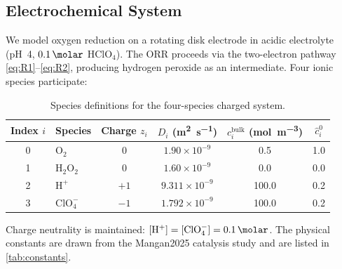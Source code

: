 \documentclass[11pt,a4paper]{article}
\begin{document}
\subsection{Electrochemical System}\label{sec:system}

We model oxygen reduction on a rotating disk electrode in acidic
electrolyte (pH~4, $\SI{0.1}{\molar}$ $\mathrm{HClO_4}$). The ORR
proceeds via the two-electron pathway \eqref{eq:R1}--\eqref{eq:R2},
producing hydrogen peroxide as an intermediate. Four ionic species
participate:

\begin{table}[H]
\centering
\caption{Species definitions for the four-species charged system.}
\label{tab:species}
\begin{tabular}{clcccc}
\toprule
Index $i$ & Species & Charge $z_i$ & $D_i$ (\si{\metre\squared\per\second})
  & $c_i^{\mathrm{bulk}}$ (\si{\mol\per\metre\cubed})
  & $\hat{c}_i^0$ \\
\midrule
0 & $\mathrm{O_2}$      &  0  & $1.90 \times 10^{-9}$ & 0.5   & 1.0 \\
1 & $\mathrm{H_2O_2}$   &  0  & $1.60 \times 10^{-9}$ & 0.0   & 0.0 \\
2 & $\mathrm{H^+}$      & $+1$ & $9.311\times 10^{-9}$ & 100.0 & 0.2 \\
3 & $\mathrm{ClO_4^-}$  & $-1$ & $1.792\times 10^{-9}$ & 100.0 & 0.2 \\
\bottomrule
\end{tabular}
\end{table}

Charge neutrality is maintained: $[\mathrm{H^+}] = [\mathrm{ClO_4^-}] =
\SI{0.1}{\molar}$. The physical constants are drawn from the Mangan2025
catalysis study and are listed in \cref{tab:constants}.
\end{document}
